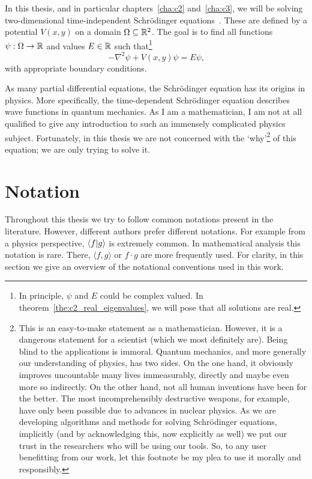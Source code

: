 In this thesis, and in particular chapters~\ref{cha:c2} and~\ref{cha:c3}, we will be solving two-dimensional time-independent Schrödinger equations~\cite{schroedinger_quantisierung_1926}. These are defined by a potential $V(x, y)$ on a domain $\Omega \subseteq \mathbb{R}^2$. The goal is to find all functions $\psi : \Omega \to \mathbb{R}$ and values $E \in \mathbb{R}$ such that\footnote{In principle, $\psi$ and $E$ could be complex valued. In theorem~\ref{the:c2_real_eigenvalues}, we will pose that all solutions are real.}
$$
-\nabla^2\psi + V(x, y) \psi = E \psi\text{,}
$$
with appropriate boundary conditions.

As many partial differential equations, the Schrödinger equation has its origins in physics. More specifically, the time-dependent Schrödinger equation describes wave functions in quantum mechanics. As I am a mathematician, I am not at all qualified to give any introduction to such an immensely complicated physics subject. Fortunately, in this thesis we are not concerned with the `why'\footnote{This is an easy-to-make statement as a mathematician. However, it is a dangerous statement for a scientist (which we most definitely are). Being blind to the applications is immoral. Quantum mechanics, and more generally our understanding of physics, has two sides. On the one hand, it obviously improves uncountable many lives immeasurably, directly and maybe even more so indirectly. On the other hand, not all human inventions have been for the better. The most incomprehensibly destructive weapons, for example, have only been possible due to advances in nuclear physics. As we are developing algorithms and methods for solving Schrödinger equations, implicitly (and by acknowledging this, now explicitly as well) we put our trust in the researchers who will be using our tools. So, to any user benefitting from our work, let this footnote be my plea to use it morally and responsibly.} of this equation; we are only trying to solve it.

\section{Notation}

Throughout this thesis we try to follow common notations present in the literature. However, different authors prefer different notations. For example from a physics perspective, $\bra{f}\ket{g}$ is extremely common. In mathematical analysis this notation is rare. There, $\langle f, g \rangle$ or $f \cdot g$ are more frequently used. For clarity, in this section we give an overview of the notational conventions used in this work.

